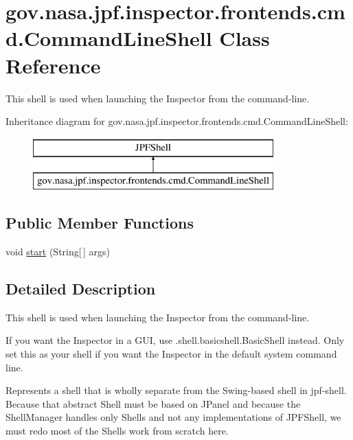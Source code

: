 \hypertarget{classgov_1_1nasa_1_1jpf_1_1inspector_1_1frontends_1_1cmd_1_1_command_line_shell}{}\section{gov.\+nasa.\+jpf.\+inspector.\+frontends.\+cmd.\+Command\+Line\+Shell Class Reference}
\label{classgov_1_1nasa_1_1jpf_1_1inspector_1_1frontends_1_1cmd_1_1_command_line_shell}


This shell is used when launching the Inspector from the command-\/line.  


Inheritance diagram for gov.\+nasa.\+jpf.\+inspector.\+frontends.\+cmd.\+Command\+Line\+Shell\+:\begin{figure}[H]
\begin{center}
\leavevmode
\includegraphics[height=2.000000cm]{classgov_1_1nasa_1_1jpf_1_1inspector_1_1frontends_1_1cmd_1_1_command_line_shell}
\end{center}
\end{figure}
\subsection*{Public Member Functions}
\begin{DoxyCompactItemize}
\item 
void \hyperlink{classgov_1_1nasa_1_1jpf_1_1inspector_1_1frontends_1_1cmd_1_1_command_line_shell_a62b9d190fc4ff76cd0a1d13968674874}{start} (String\mbox{[}$\,$\mbox{]} args)
\end{DoxyCompactItemize}


\subsection{Detailed Description}
This shell is used when launching the Inspector from the command-\/line. 

If you want the Inspector in a G\+UI, use .shell.\+basicshell.\+Basic\+Shell instead. Only set this as your shell if you want the Inspector in the default system command line.

Represents a shell that is wholly separate from the Swing-\/based shell in jpf-\/shell. Because that abstract Shell must be based on J\+Panel and because the Shell\+Manager handles only Shells and not any implementations of J\+P\+F\+Shell, we must redo most of the Shell\textquotesingle{}s work from scratch here. 

